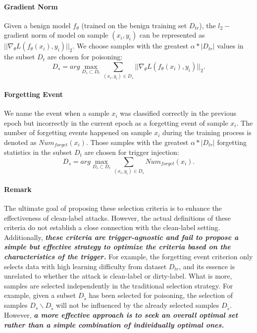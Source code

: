 \documentclass{article}
\begin{document}
\paragraph{Gradient Norm}
Given a benign model \(f_{\theta}\) (trained on the benign training set \(D_{tr}\)), the \(l_2-\) gradient norm of model on sample \((x_i,y_i)\) can be represented as \(||\nabla_{\theta} L(f_{\theta}(x_i), y_i)||_2\). We choose samples with the greatest \(\alpha*|D_{tr}|\) values in the subset \(D_t\) are chosen for
poisoning:
\begin{equation}
D_s = arg \max_{D_s\subset D_t}\sum_{(x_i,y_i) \in D_s}||\nabla_{\theta} L(f_{\theta}(x_i), y_i)||_2.
\end{equation}

\paragraph{Forgetting Event} We name the event when a sample \(x_i\) was classified correctly in the previous epoch but incorrectly in the current epoch as a forgetting event of sample \(x_i\). The number of forgetting events happened on sample \(x_i\) during the training process is denoted as \(Num_{forget}(x_i)\). Those samples with the greatest \(\alpha*|D_{tr}|\) forgetting statistics in the subset \(D_t\) are chosen for trigger injection:
\begin{equation}
D_s = arg \max_{D_s\subset D_t}\sum_{(x_i,y_i) \in D_s}Num_{forget}(x_i).
\end{equation}

\paragraph{Remark}
The ultimate goal of proposing these selection criteria is to enhance the effectiveness of clean-label attacks. However, the actual definitions of these criteria do not establish a close connection with the clean-label setting. Additionally, \textbf{\textit{these criteria are trigger-agnostic and fail to propose a simple but effective strategy to optimize the criteria based on the characteristics of the trigger.}} For example, the forgetting event criterion only selects data with high learning difficulty from dataset \(D_{tr}\), and its essence is unrelated to whether the attack is clean-label or dirty-label. What is more, samples are selected independently in the traditional selection strategy. For example, given a subset \(D_{\tilde{s}}\) has been selected for poisoning, the selection of samples \(D_s\backslash D_{\tilde{s}}\) will not be influenced by the already selected samples \(D_{\tilde{s}}\). However, \textit{\textbf{a more effective approach is to seek an overall optimal set rather than a simple combination of individually optimal ones.}}
\end{document}
